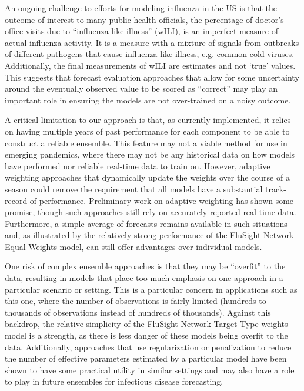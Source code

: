 \documentclass{article}\usepackage[]{graphicx}\usepackage[]{color}
\begin{document}
An ongoing challenge to efforts for modeling influenza in the US is that the outcome of interest to many public health officials, the percentage of doctor's office visits due to ``influenza-like illness'' (wILI), is an imperfect measure of actual influenza activity. 
It is a measure with a mixture of signals from outbreaks of different pathogens that cause influenza-like illness, e.g. common cold viruses.
Additionally, the final measurements of wILI are estimates and not `true' values. 
This suggests that forecast evaluation approaches that allow for some uncertainty around the eventually observed value to be scored as ``correct'' may play an important role in ensuring the models are not over-trained on a noisy outcome.
    
A critical limitation to our approach is that, as currently implemented, it relies on having multiple years of past performance for each component to be able to construct a reliable ensemble.
This feature may not a viable method for use in emerging pandemics, where there may not be any historical data on how models have performed nor reliable real-time data to train on.
However, adaptive weighting approaches that dynamically update the weights over the course of a season could remove the requirement that all models have a substantial track-record of performance. 
Preliminary work on adaptive weighting has shown some promise, though such approaches still rely on accurately reported real-time data.
Furthermore, a simple average of forecasts remains available in such situations and, as illustrated by the relatively strong performance of the FluSight Network Equal Weights model, can still offer advantages over individual models.

One risk of complex ensemble approaches is that they may be ``overfit'' to the data, resulting in models that place too much emphasis on one approach in a particular scenario or setting.
This is a particular concern in applications such as this one, where the number of observations is fairly limited (hundreds to thousands of observations instead of hundreds of thousands).
Against this backdrop, the relative simplicity of the FluSight Network Target-Type weights model is a strength, as there is less danger of these models being overfit to the data.
Additionally, approaches that use regularization or penalization to reduce the number of effective parameters estimated by a particular model have been shown to have some practical utility in similar settings and may also have a role to play in future ensembles for infectious disease forecasting.\cite{Ray2018}
\end{document}
